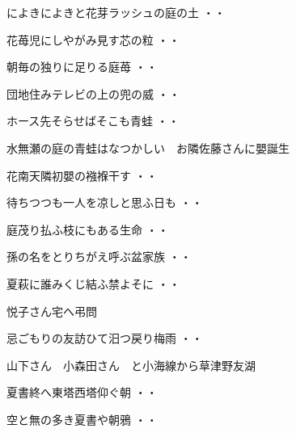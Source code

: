 \begin{shiika}によきによきと花芽ラッシュの庭の土
\hfill{・・}\end{shiika}
\begin{shiika}花苺児にしやがみ見す芯の粒
\hfill{・・}\end{shiika}
\begin{shiika}朝毎の独りに足りる庭苺
\hfill{・・}\end{shiika}
\begin{shiika}団地住みテレビの上の兜の威
\hfill{・・}\end{shiika}
\begin{shiika}ホース先そらせばそこも青蛙
\hfill{・・}\end{shiika}
\vspace{ 0.4cm}
水無瀬の庭の青蛙はなつかしい　お隣佐藤さんに嬰誕生
\begin{shiika}花南天隣初嬰の襁褓干す
\hfill{・・}\end{shiika}
\begin{shiika}待ちつつも一人を凉しと思ふ日も
\hfill{・・}\end{shiika}
\begin{shiika}庭茂り払ふ枝にもある生命
\hfill{・・}\end{shiika}
\begin{shiika}孫の名をとりちがえ呼ぶ盆家族
\hfill{・・}\end{shiika}
\begin{shiika}夏萩に誰みくじ結ふ禁よそに
\hfill{・・}\end{shiika}
\vspace{ 0.4cm}
悦子さん宅へ弔問
\begin{shiika}忌ごもりの友訪ひて汨つ戻り梅雨
\hfill{・・}\end{shiika}
\vspace{ 0.4cm}
山下さん　小森田さん　と小海線から草津野友湖
\begin{shiika}夏書終へ東塔西塔仰ぐ朝
\hfill{・・}\end{shiika}
\begin{shiika}空と無の多き夏書や朝鴉
\hfill{・・}\end{shiika}
